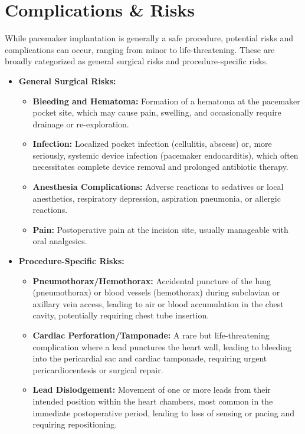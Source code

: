 \section*{Complications \& Risks}
While pacemaker implantation is generally a safe procedure, potential risks and complications can occur, ranging from minor to life-threatening. These are broadly categorized as general surgical risks and procedure-specific risks.

\begin{itemize}
  \item \textbf{General Surgical Risks:}
    \begin{itemize}
      \item \textbf{Bleeding and Hematoma:} Formation of a hematoma at the pacemaker pocket site, which may cause pain, swelling, and occasionally require drainage or re-exploration.
      \item \textbf{Infection:} Localized pocket infection (cellulitis, abscess) or, more seriously, systemic device infection (pacemaker endocarditis), which often necessitates complete device removal and prolonged antibiotic therapy.
      \item \textbf{Anesthesia Complications:} Adverse reactions to sedatives or local anesthetics, respiratory depression, aspiration pneumonia, or allergic reactions.
      \item \textbf{Pain:} Postoperative pain at the incision site, usually manageable with oral analgesics.
    \end{itemize}
  \item \textbf{Procedure-Specific Risks:}
    \begin{itemize}
      \item \textbf{Pneumothorax/Hemothorax:} Accidental puncture of the lung (pneumothorax) or blood vessels (hemothorax) during subclavian or axillary vein access, leading to air or blood accumulation in the chest cavity, potentially requiring chest tube insertion.
      \item \textbf{Cardiac Perforation/Tamponade:} A rare but life-threatening complication where a lead punctures the heart wall, leading to bleeding into the pericardial sac and cardiac tamponade, requiring urgent pericardiocentesis or surgical repair.
      \item \textbf{Lead Dislodgement:} Movement of one or more leads from their intended position within the heart chambers, most common in the immediate postoperative period, leading to loss of sensing or pacing and requiring repositioning.

\end{itemize}
\end{itemize}
